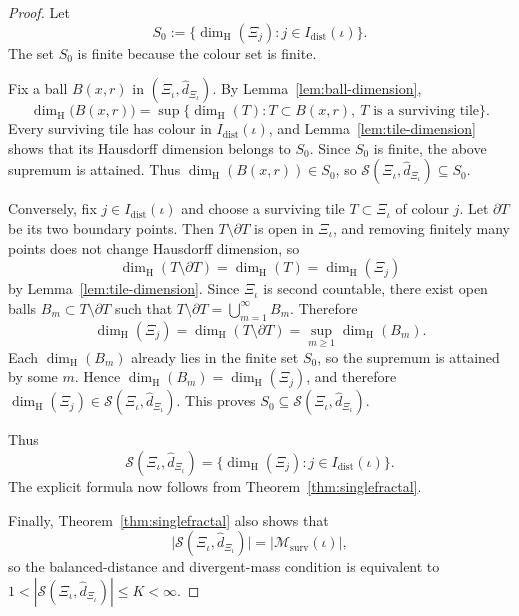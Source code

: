 \documentclass[12pt]{iopart}
\newcommand*{\dist}{d}
\newcommand*{\dimh}{\dim_\mathrm{H}}
\begin{document}
\begin{proof}
Let
\[
S_0
:=
\big\{
\dimh(\Xi_j):
j\in I_{\mathrm{dist}}(\iota)
\big\}.
\]
The set $S_0$ is finite because the colour set is finite.

Fix a ball $B(x,r)$ in $(\Xi_\iota,\hat\dist_{\Xi_\iota})$.
By Lemma~\ref{lem:ball-dimension},
\[
\dimh\big(B(x,r)\big)
=
\sup\big\{
\dimh(T):
T\subset B(x,r),\ 
T \text{ is a surviving tile}
\big\}.
\]
Every surviving tile has colour in $I_{\mathrm{dist}}(\iota)$, and Lemma~\ref{lem:tile-dimension} shows that its Hausdorff dimension belongs to $S_0$.
Since $S_0$ is finite, the above supremum is attained.
Thus $\dimh(B(x,r))\in S_0$, so
$\mathscr S(\Xi_\iota,\hat\dist_{\Xi_\iota})\subseteq S_0$.

Conversely, fix $j\in I_{\mathrm{dist}}(\iota)$ and choose a surviving tile $T\subset \Xi_\iota$ of colour $j$.
Let $\partial T$ be its two boundary points.
Then $T\setminus \partial T$ is open in $\Xi_\iota$, and removing finitely many points does not change Hausdorff dimension, so
\[
\dimh(T\setminus \partial T)=\dimh(T)=\dimh(\Xi_j)
\]
by Lemma~\ref{lem:tile-dimension}.
Since $\Xi_\iota$ is second countable, there exist open balls $B_m\subset T\setminus \partial T$ such that
$T\setminus \partial T=\bigcup_{m=1}^\infty B_m$.
Therefore
\[
\dimh(\Xi_j)
=
\dimh(T\setminus \partial T)
=
\sup_{m\ge 1}\dimh(B_m).
\]
Each $\dimh(B_m)$ already lies in the finite set $S_0$, so the supremum is attained by some $m$.
Hence $\dimh(B_m)=\dimh(\Xi_j)$, and therefore $\dimh(\Xi_j)\in \mathscr S(\Xi_\iota,\hat\dist_{\Xi_\iota})$.
This proves $S_0\subseteq \mathscr S(\Xi_\iota,\hat\dist_{\Xi_\iota})$.

Thus
\[
\mathscr S(\Xi_\iota,\hat\dist_{\Xi_\iota})
=
\big\{
\dimh(\Xi_j):
j\in I_{\mathrm{dist}}(\iota)
\big\}.
\]
The explicit formula now follows from Theorem~\ref{thm:singlefractal}.

Finally, Theorem~\ref{thm:singlefractal} also shows that
\[
\big|
\mathscr S(\Xi_\iota,\hat\dist_{\Xi_\iota})
\big|
=
\big|
\mathscr M_{\mathrm{surv}}(\iota)
\big|,
\]
so the balanced-distance and divergent-mass condition is equivalent to
$1<|\mathscr S(\Xi_\iota,\hat\dist_{\Xi_\iota})|\leq { K}<\infty$.
\end{proof}
\end{document}
